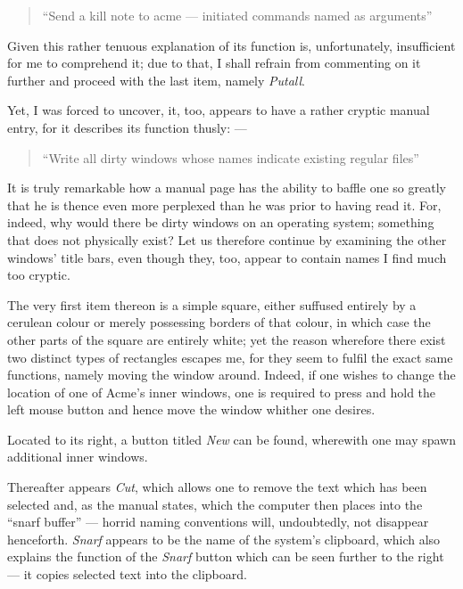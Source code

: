 \documentclass[a5paper,twoside,12pt]{report}
\begin{document}
  \begin{quote}
    ``Send a kill note to acme — initiated commands named as arguments''
  \end{quote}

  Given this rather tenuous explanation of its function is, unfortunately, insufficient for me to comprehend it; due to that, I shall refrain from commenting on it further and proceed with the last item, namely \textit{Putall}.

  Yet, I was forced to uncover, it, too, appears to have a rather cryptic manual entry, for it describes its function thusly: —

  \begin{quote}
    ``Write all dirty windows whose names indicate existing regular files''
  \end{quote}

  It is truly remarkable how a manual page has the ability to baffle one so greatly that he is thence even more perplexed than he was prior to having read it. For, indeed, why would there be dirty windows on an operating system; something that does not physically exist? Let us therefore continue by examining the other windows' title bars, even though they, too, appear to contain names I find much too cryptic.

  The very first item thereon is a simple square, either suffused entirely by a cerulean colour or merely possessing borders of that colour, in which case the other parts of the square are entirely white; yet the reason wherefore there exist two distinct types of rectangles escapes me, for they seem to fulfil the exact same functions, namely moving the window around. Indeed, if one wishes to change the location of one of Acme's inner windows, one is required to press and hold the left mouse button and hence move the window whither one desires. 

  Located to its right, a button titled \textit{New} can be found, wherewith one may spawn additional inner windows.

  Thereafter appears \textit{Cut}, which allows one to remove the text which has been selected and, as the manual states, which the computer then places into the ``snarf buffer'' — horrid naming conventions will, undoubtedly, not disappear henceforth. \textit{Snarf} appears to be the name of the system's clipboard, which also explains the function of the \textit{Snarf} button which can be seen further to the right — it copies selected text into the clipboard.
\end{document}
